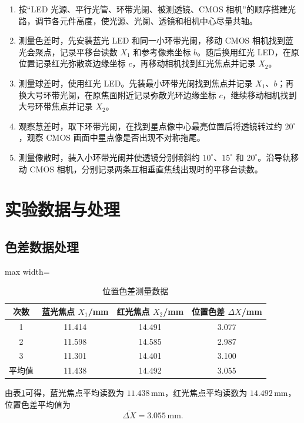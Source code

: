 \documentclass[12pt,a4paper]{article}
\begin{document}
\begin{enumerate}
  \item 按“LED 光源、平行光管、环带光阑、被测透镜、CMOS 相机”的顺序搭建光路，调节各元件高度，使光源、光阑、透镜和相机中心尽量共轴。
  \item 测量色差时，先安装蓝光 LED 和同一小环带光阑，移动 CMOS 相机找到蓝光会聚点，记录平移台读数 $X_1$ 和参考像素坐标 $b$。随后换用红光 LED，在原位置记录红光弥散斑边缘坐标 $c$，再移动相机找到红光焦点并记录 $X_2$。
  \item 测量球差时，使用红光 LED。先装最小环带光阑找到焦点并记录 $X_1$、$b$；再换大号环带光阑，在原焦面附近记录弥散光环边缘坐标 $c$，继续移动相机找到大号环带焦点并记录 $X_2$。
  \item 观察慧差时，取下环带光阑，在找到星点像中心最亮位置后将透镜转过约 $20^\circ$，观察 CMOS 画面中星点像是否出现不对称拖尾。
  \item 测量像散时，装入小环带光阑并使透镜分别倾斜约 $10^\circ$、$15^\circ$ 和 $20^\circ$。沿导轨移动 CMOS 相机，分别记录两条互相垂直焦线出现时的平移台读数。
\end{enumerate}

\section{实验数据与处理}

\subsection{色差数据处理}

\begin{table}[H]
  \centering
  \caption{位置色差测量数据}
  \label{tab:position-aberration}
  \begin{adjustbox}{max width=\textwidth}
    \begin{tabular}{cccc}
      \toprule
      次数 & 蓝光焦点 $X_1$/mm & 红光焦点 $X_2$/mm & 位置色差 $\Delta X$/mm\\
      \midrule
      1 & 11.414 & 14.491 & 3.077\\
      2 & 11.598 & 14.585 & 2.987\\
      3 & 11.301 & 14.401 & 3.100\\
      \midrule
      平均值 & 11.438 & 14.492 & 3.055\\
      \bottomrule
    \end{tabular}
  \end{adjustbox}
\end{table}

由表\ref{tab:position-aberration}可得，蓝光焦点平均读数为 $11.438\,\mathrm{mm}$，红光焦点平均读数为 $14.492\,\mathrm{mm}$，位置色差平均值为
\begin{equation}
  \overline{\Delta X}=3.055\,\mathrm{mm}.
\end{equation}
\end{document}
